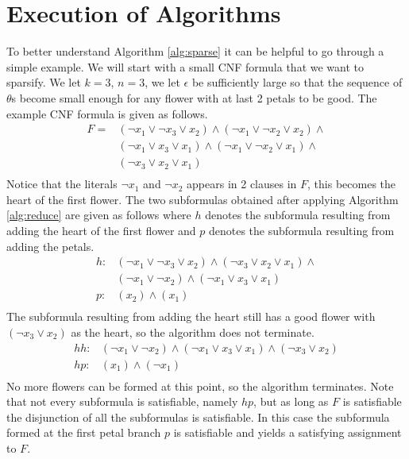 \section{Execution of Algorithms}
To better understand Algorithm \ref{alg:sparse} it can be helpful to go through a simple example.
We will start with a small CNF formula that we want to sparsify. We let $k = 3$, $n=3$, we let $\epsilon$ be sufficiently large
so that the sequence of $\theta$s become small enough for any flower with at last 2 petals to be good.
The example CNF formula is given as follows.
\begin{align*}
    F = &(\neg x_{1} \lor \neg x_{3} \lor x_{2}) \land (\neg x_{1} \lor \neg x_{2} \lor x_{2}) \land \\
    &(\neg x_{1} \lor x_{3} \lor x_{1}) \land (\neg x_{1} \lor \neg x_{2} \lor x_{1}) \land\\
    &(\neg x_{3} \lor x_{2} \lor x_{1})\\
\end{align*}
Notice that the literals $\neg x_1$ and $\neg x_2$ appears in 2 clauses in $F$, this becomes the heart of the first flower.
The two subformulas obtained after applying Algorithm \ref{alg:reduce} are given as follows where $h$ denotes the
subformula resulting from adding the heart of the first flower and $p$ denotes the subformula resulting from adding
the petals.
\begin{align*}
    h : &(\neg x_{1} \lor \neg x_{3} \lor x_{2}) \land (\neg x_{3} \lor x_{2} \lor x_{1}) \land\\
    &(\neg x_{1} \lor \neg x_{2}) \land (\neg x_{1} \lor x_{3} \lor x_{1})\\
    p : &(x_{2}) \land (x_{1})\\
\end{align*}
The subformula resulting from adding the heart still has a good flower with $(\neg x_3 \lor x_2)$ as the heart,
so the algorithm does not terminate.
\begin{align*}
    hh : &(\neg x_{1} \lor \neg x_{2}) \land (\neg x_{1} \lor x_{3} \lor x_{1})\land (\neg x_{3} \lor x_{2})\\
    hp : &(x_{1}) \land (\neg x_{1})\\
\end{align*}
No more flowers can be formed at this point, so the algorithm terminates. Note that not every subformula is satisfiable,
namely $hp$, but as long as $F$ is satisfiable the disjunction of all the subformulas is satisfiable.
In this case the subformula formed at the first petal branch $p$ is satisfiable and
yields a satisfying assignment to $F$.


